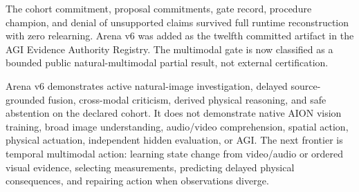 The cohort commitment, proposal commitments, gate record, procedure champion,
and denial of unsupported claims survived full runtime reconstruction with zero
relearning.  Arena v6 was added as the twelfth committed artifact in the AGI
Evidence Authority Registry.  The multimodal gate is now classified as a
bounded public natural-multimodal partial result, not external certification.

Arena v6 demonstrates active natural-image investigation, delayed
source-grounded fusion, cross-modal criticism, derived physical reasoning, and
safe abstention on the declared cohort.  It does not demonstrate native AION
vision training, broad image understanding, audio/video comprehension, spatial
action, physical actuation, independent hidden evaluation, or AGI.  The next
frontier is temporal multimodal action: learning state change from video/audio
or ordered visual evidence, selecting measurements, predicting delayed physical
consequences, and repairing action when observations diverge.
